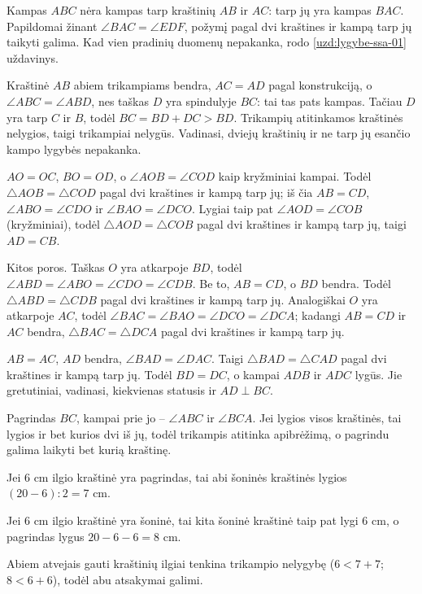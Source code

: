 \documentclass[12pt,a4paper,reqno]{amsart}
\theoremstyle{plain}\newtheorem{theorem}{Teorema}[section]
\theoremstyle{definition}
\theoremstyle{remark}\newtheorem{remark}[theorem]{Pastaba}\newtheorem*{remark*}{Pastaba}
\theoremstyle{definition}\newtheorem*{problem*}{Uždavinys}
\begin{document}
\begin{solution}[\ref{uzd:lygybe-klaida-01}] Kampas $ABC$ nėra kampas tarp kraštinių $AB$ ir $AC$: tarp jų yra kampas $BAC$. Papildomai žinant $\angle BAC=\angle EDF$, požymį pagal dvi kraštines ir kampą tarp jų taikyti galima. Kad vien pradinių duomenų nepakanka, rodo \ref{uzd:lygybe-ssa-01} uždavinys. \end{solution}
\begin{solution}[\ref{uzd:lygybe-ssa-01}] Kraštinė $AB$ abiem trikampiams bendra, $AC=AD$ pagal konstrukciją, o $\angle ABC=\angle ABD$, nes taškas $D$ yra spindulyje $BC$: tai tas pats kampas. Tačiau $D$ yra tarp $C$ ir $B$, todėl $BC=BD+DC>BD$. Trikampių atitinkamos kraštinės nelygios, taigi trikampiai nelygūs. Vadinasi, dviejų kraštinių ir ne tarp jų esančio kampo lygybės nepakanka. \end{solution}
\begin{solution}[\ref{uzd:lygybe-susikirtimas-01}] $AO=OC$, $BO=OD$, o $\angle AOB=\angle COD$ kaip kryžminiai kampai. Todėl $\triangle AOB=\triangle COD$ pagal dvi kraštines ir kampą tarp jų; iš čia $AB=CD$, $\angle ABO=\angle CDO$ ir $\angle BAO=\angle DCO$. Lygiai taip pat $\angle AOD=\angle COB$ (kryžminiai), todėl $\triangle AOD=\triangle COB$ pagal dvi kraštines ir kampą tarp jų, taigi $AD=CB$.\par
Kitos poros. Taškas $O$ yra atkarpoje $BD$, todėl $\angle ABD=\angle ABO=\angle CDO=\angle CDB$. Be to, $AB=CD$, o $BD$ bendra. Todėl $\triangle ABD=\triangle CDB$ pagal dvi kraštines ir kampą tarp jų. Analogiškai $O$ yra atkarpoje $AC$, todėl $\angle BAC=\angle BAO=\angle DCO=\angle DCA$; kadangi $AB=CD$ ir $AC$ bendra, $\triangle BAC=\triangle DCA$ pagal dvi kraštines ir kampą tarp jų. \end{solution}
\begin{solution}[\ref{uzd:lygybe-pusiaukampine-01}] $AB=AC$, $AD$ bendra, $\angle BAD=\angle DAC$. Taigi $\triangle BAD=\triangle CAD$ pagal dvi kraštines ir kampą tarp jų. Todėl $BD=DC$, o kampai $ADB$ ir $ADC$ lygūs. Jie gretutiniai, vadinasi, kiekvienas statusis ir $AD\perp BC$. \end{solution}
\begin{solution}[\ref{uzd:lygias-supratimas-01}] Pagrindas $BC$, kampai prie jo – $\angle ABC$ ir $\angle BCA$. Jei lygios visos kraštinės, tai lygios ir bet kurios dvi iš jų, todėl trikampis atitinka apibrėžimą, o pagrindu galima laikyti bet kurią kraštinę. \end{solution}
\begin{solution}[\ref{uzd:lygias-perimetras-01}]
Jei $6$ cm ilgio kraštinė yra pagrindas, tai abi šoninės kraštinės lygios $(20-6):2=7$ cm.\par
Jei $6$ cm ilgio kraštinė yra šoninė, tai kita šoninė kraštinė taip pat lygi $6$ cm, o pagrindas lygus $20-6-6=8$ cm.\par
Abiem atvejais gauti kraštinių ilgiai tenkina trikampio nelygybę ($6<7+7$; $8<6+6$), todėl abu atsakymai galimi.
\end{solution}
\end{document}
